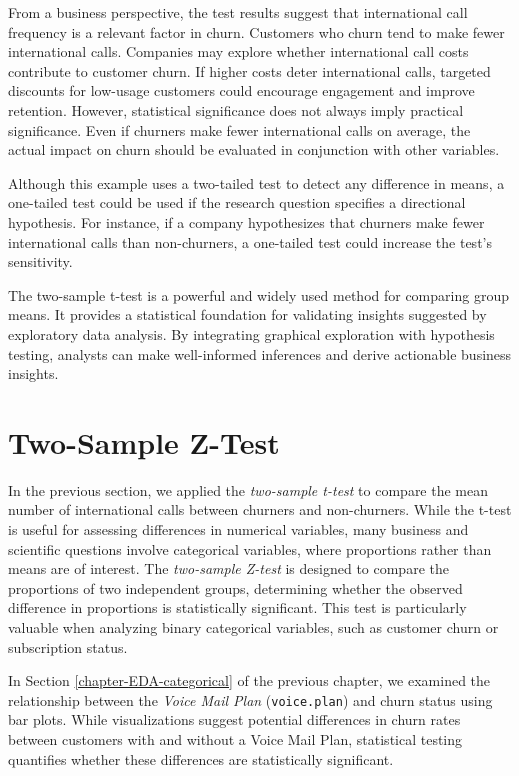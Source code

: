 \documentclass[
  11pt,
]{book}
\newcommand{\passthrough}[1]{#1}
\theoremstyle{definition}
\theoremstyle{definition}
\theoremstyle{definition}
\theoremstyle{definition}
\theoremstyle{remark}
\begin{document}
From a business perspective, the test results suggest that international call frequency is a relevant factor in churn. Customers who churn tend to make fewer international calls. Companies may explore whether international call costs contribute to customer churn. If higher costs deter international calls, targeted discounts for low-usage customers could encourage engagement and improve retention. However, statistical significance does not always imply practical significance. Even if churners make fewer international calls on average, the actual impact on churn should be evaluated in conjunction with other variables.

Although this example uses a two-tailed test to detect any difference in means, a one-tailed test could be used if the research question specifies a directional hypothesis. For instance, if a company hypothesizes that churners make fewer international calls than non-churners, a one-tailed test could increase the test's sensitivity.

The two-sample t-test is a powerful and widely used method for comparing group means. It provides a statistical foundation for validating insights suggested by exploratory data analysis. By integrating graphical exploration with hypothesis testing, analysts can make well-informed inferences and derive actionable business insights.

\section{Two-Sample Z-Test}\label{two-sample-z-test}

In the previous section, we applied the \emph{two-sample t-test} to compare the mean number of international calls between churners and non-churners. While the t-test is useful for assessing differences in numerical variables, many business and scientific questions involve categorical variables, where proportions rather than means are of interest. The \emph{two-sample Z-test} is designed to compare the proportions of two independent groups, determining whether the observed difference in proportions is statistically significant. This test is particularly valuable when analyzing binary categorical variables, such as customer churn or subscription status.

In Section \ref{chapter-EDA-categorical} of the previous chapter, we examined the relationship between the \emph{Voice Mail Plan} (\passthrough{\lstinline!voice.plan!}) and churn status using bar plots. While visualizations suggest potential differences in churn rates between customers with and without a Voice Mail Plan, statistical testing quantifies whether these differences are statistically significant.
\end{document}
